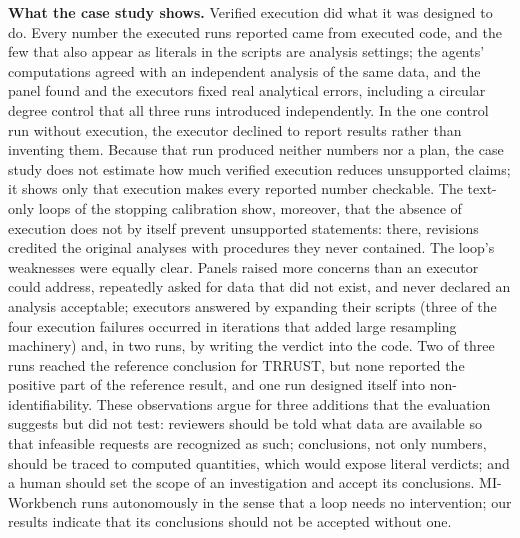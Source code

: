 \documentclass[10pt,letterpaper]{article}
\begin{document}
\textbf{What the case study shows.} Verified execution did what it was designed to do. Every number the executed runs reported came from executed code, and the few that also appear as literals in the scripts are analysis settings; the agents' computations agreed with an independent analysis of the same data, and the panel found and the executors fixed real analytical errors, including a circular degree control that all three runs introduced independently. In the one control run without execution, the executor declined to report results rather than inventing them. Because that run produced neither numbers nor a plan, the case study does not estimate how much verified execution reduces unsupported claims; it shows only that execution makes every reported number checkable. The text-only loops of the stopping calibration show, moreover, that the absence of execution does not by itself prevent unsupported statements: there, revisions credited the original analyses with procedures they never contained. The loop's weaknesses were equally clear. Panels raised more concerns than an executor could address, repeatedly asked for data that did not exist, and never declared an analysis acceptable; executors answered by expanding their scripts (three of the four execution failures occurred in iterations that added large resampling machinery) and, in two runs, by writing the verdict into the code. Two of three runs reached the reference conclusion for TRRUST, but none reported the positive part of the reference result, and one run designed itself into non-identifiability. These observations argue for three additions that the evaluation suggests but did not test: reviewers should be told what data are available so that infeasible requests are recognized as such; conclusions, not only numbers, should be traced to computed quantities, which would expose literal verdicts; and a human should set the scope of an investigation and accept its conclusions. MI-Workbench runs autonomously in the sense that a loop needs no intervention; our results indicate that its conclusions should not be accepted without one.
\end{document}
